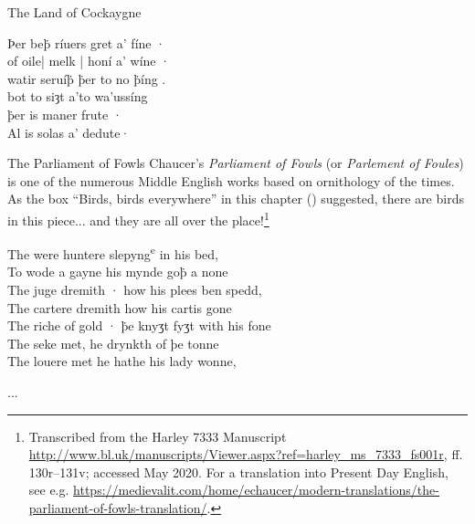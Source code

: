 \begin{texts}{The Land of Cockaygne}
\begin{textglossed}
Þer be\.{þ} ríuers gret a' fíne ·\\
of oile| melk | honí a' wíne ·\\
watir seruí\.{þ} \.{þ}er to no \.{þ}íng .\\
bot to siȝt a'to wa'ussíng\\
\.{þ}er is maner frute ·\\
Al is solas a' dedute·
\end{textglossed}


\end{texts}

\begin{texts}{The Parliament of Fowls}\label{ME-fowls}
Chaucer's \textit{Parliament of Fowls} (or \textit{Parlement of Foules}) is one of the numerous Middle English works based on ornithology of the times. As the box ``Birds, birds everywhere'' in this chapter () suggested, there are birds in this piece... and they are all over the place!\footnote{Transcribed from the Harley 7333 Manuscript \url{http://www.bl.uk/manuscripts/Viewer.aspx?ref=harley_ms_7333_fs001r}, ff. 130r--131v; accessed May 2020. For a translation into Present Day English, see e.g. \url{https://medievalit.com/home/echaucer/modern-translations/the-parliament-of-fowls-translation/}.}

\begin{textglossed}
The were huntere slepyng\textsuperscript{e} in his bed,\\
To wode a gayne his mynde go\.{þ} a none\\
The juge dremith · how his plees ben spedd,\\
The cartere dremith how his cartis gone\\
The riche of gold · \.{þ}e knyʒt fyʒt with his fone\\
The seke met, he drynkth of þe tonne\\
The louere met he hathe his lady wonne,

...


\end{textglossed}
\end{texts}
